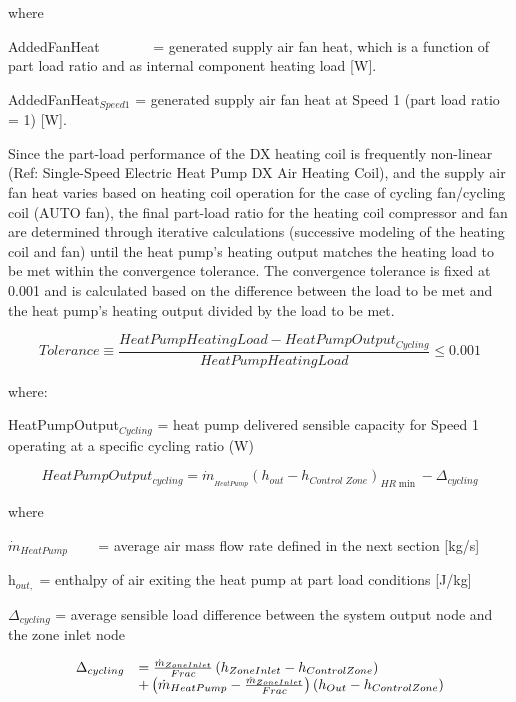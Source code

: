 where

AddedFanHeat~~~~~~~ = generated supply air fan heat, which is a function of part load ratio and as internal component heating load {[}W{]}.

AddedFanHeat\(_{Speed1}\) = generated supply air fan heat at Speed 1 (part load ratio = 1) {[}W{]}.

Since the part-load performance of the DX heating coil is frequently non-linear (Ref: Single-Speed Electric Heat Pump DX Air Heating Coil), and the supply air fan heat varies based on heating coil operation for the case of cycling fan/cycling coil (AUTO fan), the final part-load ratio for the heating coil compressor and fan are determined through iterative calculations (successive modeling of the heating coil and fan) until the heat pump's heating output matches the heating load to be met within the convergence tolerance. The convergence tolerance is fixed at 0.001 and is calculated based on the difference between the load to be met and the heat pump's heating output divided by the load to be met.

\begin{equation}
  Tolerance \equiv \frac{HeatPumpHeatingLoad - HeatPumpOutput_{Cycling}}{HeatPumpHeatingLoad} \leq 0.001
\end{equation}

where:

HeatPumpOutput\(_{Cycling}\) = heat pump delivered sensible capacity for Speed 1 operating at a specific cycling ratio (W)

\begin{equation}
HeatPumpOutpu{t_{cycling}} = {\dot m_{_{HeatPump}}}{\left( {{h_{out}} - {h_{Control\;Zone}}} \right)_{HR\min }} - {\Delta_{cycling}}
\end{equation}

where

\({\dot m_{HeatPump}}\) ~~~ = average air mass flow rate defined in the next section {[}kg/s{]}

h\(_{out,}\) = enthalpy of air exiting the heat pump at part load conditions {[}J/kg{]}

\(\Delta_{cycling}\) = average sensible load difference between the system output node and the zone inlet node

\begin{equation}
  \begin{array}{rl}
    \Delta_{cycling} &= \frac{\dot{m}_{ZoneInlet}}{Frac} \PB{h_{ZoneInlet} - h_{ControlZone}} \\
                           &+ \PB{\dot{m}_{HeatPump} - \frac{\dot{m}_{ZoneInlet}}{Frac}} \PB{h_{Out} - h_{ControlZone}}
  \end{array}
\end{equation}

